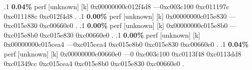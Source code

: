 \begin{profile}
{.1 \textbf{ 0.04\%} perf             [unknown]              [k] 0x00000000c012f4d8\newline {} ---0xc003c100\newline {} 0xc011197c\newline {} 0xc011188c\newline {} 0xc012f4d8\newline {} . 
.1 \textbf{ 0.00\%} perf             [unknown]              [k] 0x00000000c015e830\newline {} ---0xc015e830\newline {} 0xc00660e0\newline {} . 
.1 \textbf{ 0.00\%} perf             [unknown]              [k] 0x00000000c015e8b0\newline {} ---0xc015e8b0\newline {} 0xc015e830\newline {} 0xc00660e0\newline {} . 
.1 \textbf{ 0.00\%} perf             [unknown]              [k] 0x00000000c015cea4\newline {} ---0xc015cea4\newline {} 0xc015e8b0\newline {} 0xc015e830\newline {} 0xc00660e0\newline {} . 
.1 \textbf{ 0.04\%} perf             [unknown]              [k] 0x00000000c00660e0\newline {} ---0\newline {} 0xc003c100\newline {} 0xc0113f48\newline {} 0xc0113dd8\newline {} 0xc01349cc\newline {} 0xc015cea4\newline {} 0xc015e8b0\newline {} 0xc015e830\newline {} 0xc00660e0\newline {} . 
}
\end{profile}
